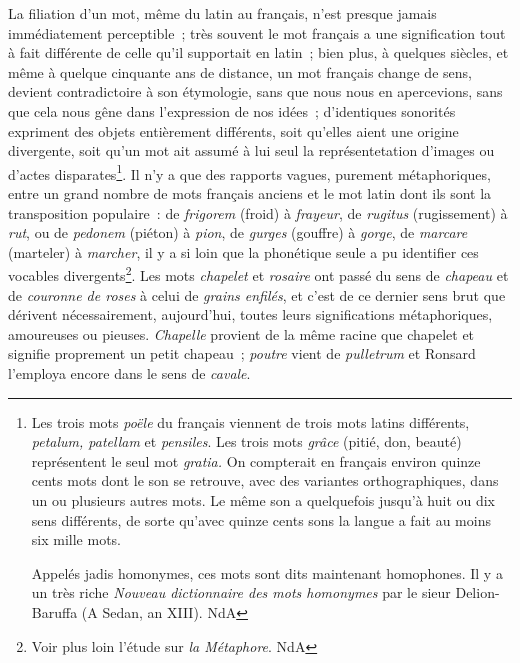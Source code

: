 \documentclass[french,twoside]{book} %
\begin{document}
La filiation d’un mot, même du latin au français, n’est presque jamais immédiatement perceptible ; très souvent le mot français a une signification tout à fait différente de celle qu’il supportait en latin ; bien plus, à quelques siècles, et même à quelque cinquante ans de distance, un mot français change de sens, devient contradictoire à son étymologie, sans que nous nous en apercevions, sans que cela nous gêne dans l’expression de nos idées ; d’identiques sonorités expriment des objets entièrement différents, soit qu’elles aient une origine divergente, soit qu’un mot ait assumé à lui seul la représentetation d’images ou d’actes disparates\footnote{\noindent Les trois mots {\itshape poële} du français viennent de trois mots latins différents, {\itshape petalum, patellam} et {\itshape pensiles}. Les trois mots {\itshape grâce} (pitié, don, beauté) représentent le seul mot {\itshape gratia.} On compterait en français environ quinze cents mots dont le son se retrouve, avec des variantes orthographiques, dans un ou plusieurs autres mots. Le même son a quelquefois jusqu’à huit ou dix sens différents, de sorte qu’avec quinze cents sons la langue a fait au moins six mille mots.\par
 Appelés jadis homonymes, ces mots sont dits maintenant homophones. Il y a un très riche {\itshape Nouveau dictionnaire des mots homonymes} par le sieur Delion-Baruffa (A Sedan, an XIII). NdA 
}. Il n’y a que des rapports vagues, purement métaphoriques, entre un grand nombre de mots français anciens et le mot latin dont ils sont la transposition populaire : de {\itshape frigorem} (froid) à {\itshape frayeur}, de {\itshape rugitus} (rugissement) à {\itshape rut}, ou de {\itshape pedonem} (piéton) à {\itshape pion}, de {\itshape gurges} (gouffre) à {\itshape gorge}, de {\itshape marcare} (marteler) à {\itshape marcher}, il y a si loin que la phonétique seule a pu identifier ces vocables divergents\footnote{Voir plus loin l’étude sur {\itshape la Métaphore}. NdA}. Les mots {\itshape chapelet} et {\itshape rosaire} ont passé du sens de {\itshape chapeau} et de {\itshape couronne de roses} à celui de {\itshape grains enfilés}, et c’est de ce dernier sens brut que dérivent nécessairement, aujourd’hui, toutes leurs significations métaphoriques, amoureuses ou pieuses. {\itshape Chapelle} provient de la même racine que chapelet et signifie proprement un petit chapeau ; {\itshape poutre} vient de {\itshape pulletrum} et Ronsard l’employa encore dans le sens de {\itshape cavale}.\par
\end{document}
